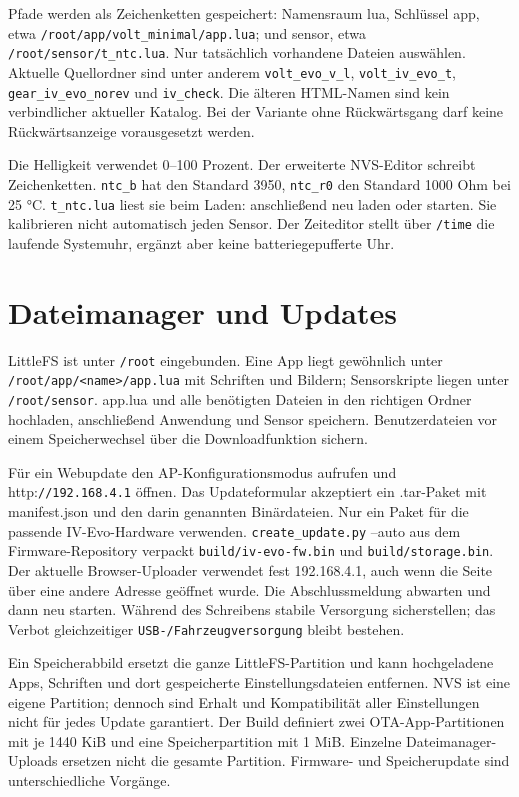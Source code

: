 Pfade werden als Zeichenketten gespeichert: Namensraum lua, Schlüssel app, etwa \nolinkurl{/root/app/volt_minimal/app.lua}; und sensor, etwa \nolinkurl{/root/sensor/t_ntc.lua}. Nur tatsächlich vorhandene Dateien auswählen. Aktuelle Quellordner sind unter anderem \nolinkurl{volt_evo_v_l}, \nolinkurl{volt_iv_evo_t}, \nolinkurl{gear_iv_evo_norev} und \nolinkurl{iv_check}. Die älteren HTML-Namen sind kein verbindlicher aktueller Katalog. Bei der Variante ohne Rückwärtsgang darf keine Rückwärtsanzeige vorausgesetzt werden.

Die Helligkeit verwendet 0–100 Prozent. Der erweiterte NVS-Editor schreibt Zeichenketten. \nolinkurl{ntc_b} hat den Standard 3950, \nolinkurl{ntc_r0} den Standard 1000 Ohm bei 25 °C. \nolinkurl{t_ntc.lua} liest sie beim Laden: anschließend neu laden oder starten. Sie kalibrieren nicht automatisch jeden Sensor. Der Zeiteditor stellt über \nolinkurl{/time} die laufende Systemuhr, ergänzt aber keine batteriegepufferte Uhr.

\section{Dateimanager und Updates}
LittleFS ist unter \nolinkurl{/root} eingebunden. Eine App liegt gewöhnlich unter \nolinkurl{/root/app/<name>/app.lua} mit Schriften und Bildern; Sensorskripte liegen unter \nolinkurl{/root/sensor}. app.lua und alle benötigten Dateien in den richtigen Ordner hochladen, anschließend Anwendung und Sensor speichern. Benutzerdateien vor einem Speicherwechsel über die Downloadfunktion sichern.

Für ein Webupdate den AP-Konfigurationsmodus aufrufen und http:\nolinkurl{//192.168.4.1} öffnen. Das Updateformular akzeptiert ein .tar-Paket mit manifest.json und den darin genannten Binärdateien. Nur ein Paket für die passende IV-Evo-Hardware verwenden. \nolinkurl{create_update.py} --auto aus dem Firmware-Repository verpackt \nolinkurl{build/iv-evo-fw.bin} und \nolinkurl{build/storage.bin}. Der aktuelle Browser-Uploader verwendet fest 192.168.4.1, auch wenn die Seite über eine andere Adresse geöffnet wurde. Die Abschlussmeldung abwarten und dann neu starten. Während des Schreibens stabile Versorgung sicherstellen; das Verbot gleichzeitiger \nolinkurl{USB-/Fahrzeugversorgung} bleibt bestehen.

Ein Speicherabbild ersetzt die ganze LittleFS-Partition und kann hochgeladene Apps, Schriften und dort gespeicherte Einstellungsdateien entfernen. NVS ist eine eigene Partition; dennoch sind Erhalt und Kompatibilität aller Einstellungen nicht für jedes Update garantiert. Der Build definiert zwei OTA-App-Partitionen mit je 1440 KiB und eine Speicherpartition mit 1 MiB. Einzelne Dateimanager-Uploads ersetzen nicht die gesamte Partition. Firmware- und Speicherupdate sind unterschiedliche Vorgänge.

